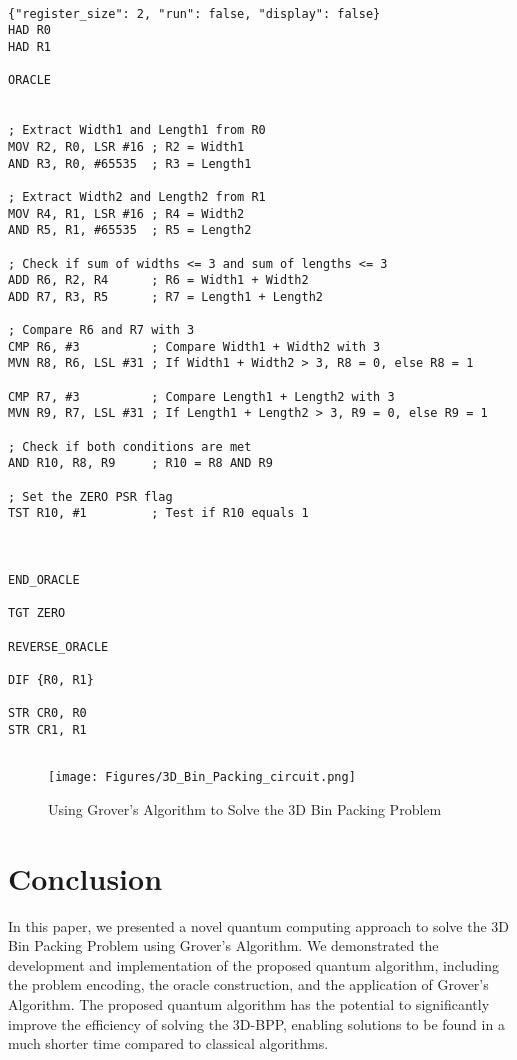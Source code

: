 \begin{lstlisting}

{"register_size": 2, "run": false, "display": false}
HAD R0
HAD R1

ORACLE


; Extract Width1 and Length1 from R0
MOV R2, R0, LSR #16 ; R2 = Width1
AND R3, R0, #65535  ; R3 = Length1

; Extract Width2 and Length2 from R1
MOV R4, R1, LSR #16 ; R4 = Width2
AND R5, R1, #65535  ; R5 = Length2

; Check if sum of widths <= 3 and sum of lengths <= 3
ADD R6, R2, R4      ; R6 = Width1 + Width2
ADD R7, R3, R5      ; R7 = Length1 + Length2

; Compare R6 and R7 with 3
CMP R6, #3          ; Compare Width1 + Width2 with 3
MVN R8, R6, LSL #31 ; If Width1 + Width2 > 3, R8 = 0, else R8 = 1

CMP R7, #3          ; Compare Length1 + Length2 with 3
MVN R9, R7, LSL #31 ; If Length1 + Length2 > 3, R9 = 0, else R9 = 1

; Check if both conditions are met
AND R10, R8, R9     ; R10 = R8 AND R9

; Set the ZERO PSR flag
TST R10, #1         ; Test if R10 equals 1



END_ORACLE

TGT ZERO

REVERSE_ORACLE

DIF {R0, R1}

STR CR0, R0
STR CR1, R1


\end{lstlisting}

\begin{figure}[htp]
    \centering
    \texttt{[image: Figures/3D\_Bin\_Packing\_circuit.png]}
    \caption{Using Grover's Algorithm to Solve the 3D Bin Packing Problem}
    \label{fig:3D_Bin_Packing}
\end{figure}

\section{Conclusion}
In this paper, we presented a novel quantum computing approach to solve the 3D Bin Packing Problem using Grover's Algorithm. We demonstrated the development and implementation of the proposed quantum algorithm, including the problem encoding, the oracle construction, and the application of Grover's Algorithm. The proposed quantum algorithm has the potential to significantly improve the efficiency of solving the 3D-BPP, enabling solutions to be found in a much shorter time compared to classical algorithms.

